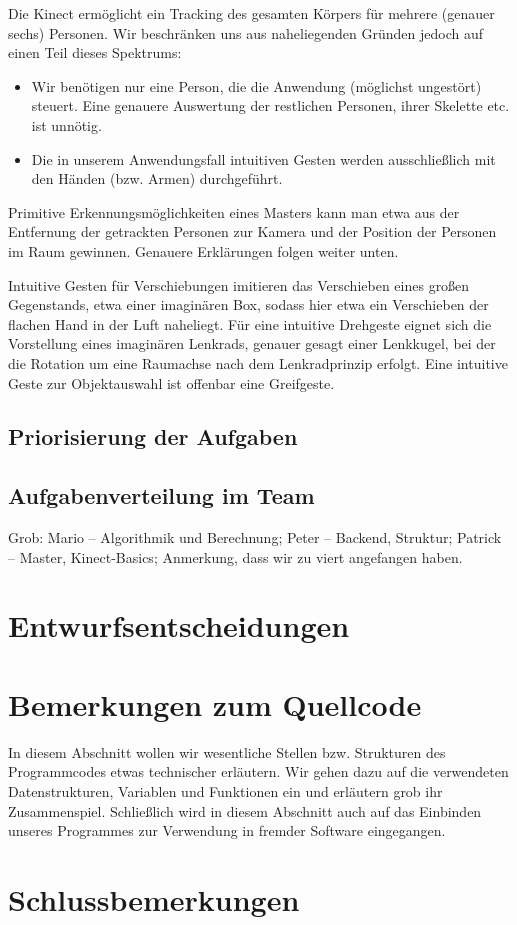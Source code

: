 \documentclass[12pt,a4paper]{article}
\begin{document}
	Die Kinect ermöglicht ein Tracking des gesamten Körpers für mehrere (genauer sechs) Personen. Wir beschränken uns aus naheliegenden Gründen jedoch auf einen Teil dieses Spektrums:
	\begin{itemize}
		\item Wir benötigen nur eine Person, die die Anwendung (möglichst ungestört) steuert. Eine genauere Auswertung der restlichen Personen, ihrer Skelette etc. ist unnötig.
		\item Die in unserem Anwendungsfall intuitiven Gesten werden ausschließlich mit den Händen (bzw. Armen) durchgeführt.
	\end{itemize}
	Primitive Erkennungsmöglichkeiten eines Masters kann man etwa aus der Entfernung der getrackten Personen zur Kamera und der Position der Personen im Raum gewinnen. Genauere Erklärungen folgen weiter unten.\par 
	Intuitive Gesten für Verschiebungen imitieren das Verschieben eines großen Gegenstands, etwa einer imaginären Box, sodass hier etwa ein Verschieben der flachen Hand in der Luft naheliegt. Für eine intuitive Drehgeste eignet sich die Vorstellung eines imaginären Lenkrads, genauer gesagt einer Lenkkugel, bei der die Rotation um eine Raumachse nach dem Lenkradprinzip erfolgt. Eine intuitive Geste zur Objektauswahl ist offenbar eine Greifgeste.
	\subsection{Priorisierung der Aufgaben}
	\subsection{Aufgabenverteilung im Team}
	Grob:
		Mario -- Algorithmik und Berechnung;
		Peter -- Backend, Struktur;
		Patrick -- Master, Kinect-Basics;
	Anmerkung, dass wir zu viert angefangen haben.
\clearpage
\section{Entwurfsentscheidungen}
	
	
	
	
%
%
\clearpage
\section{Bemerkungen zum Quellcode}
In diesem Abschnitt wollen wir wesentliche Stellen bzw. Strukturen des Programmcodes etwas technischer erläutern. Wir gehen dazu auf die verwendeten Datenstrukturen, Variablen und Funktionen ein und erläutern grob ihr Zusammenspiel. Schließlich wird in diesem Abschnitt auch auf das Einbinden unseres Programmes zur Verwendung in fremder Software eingegangen.
	
	
	
%
%
\section{Schlussbemerkungen}

\newpage
\printbibliography
\end{document}
